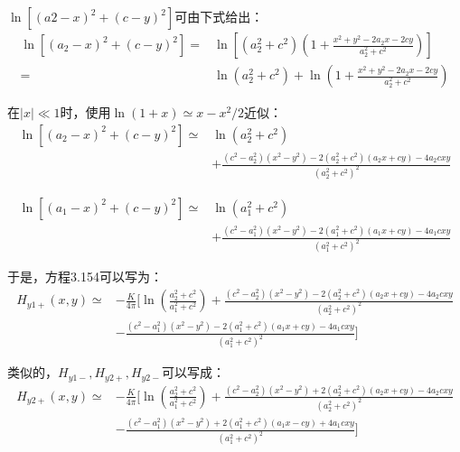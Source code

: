 $\ln[(a2−x)^2+(c−y)^2]$可由下式给出：
\begin{equation*}
\begin{split}
\ln[(a_{2}-x)^{2}+(c-y)^{2}]=&\ln[(a_{2}^{2}+c^{2})(1+\frac{x^{2}+y^{2}-2a_{2}x-2cy}{a_{2}^{2}+c^{2}})]\\
=&\ln(a_{2}^{2}+c^{2})+\ln(1+\frac{x^{2}+y^{2}-2a_{2}x-2cy}{a_{2}^{2}+c^{2}})
\end{split}
\end{equation*}

在$|x|\ll 1$时，使用$\ln(1+x)\simeq x-x^2 /2$近似：
\begin{equation*}
\begin{split}
\ln[(a_{2}-x)^{2}+(c-y)^{2}]\simeq&\ln(a_{2}^{2}+c^{2})\\
&+\frac{(c^{2}-a_{2}^{2})(x^{2}-y^{2})-2(a_{2}^{2}+c^{2})(a_{2}x+cy)-4a_{2}cxy}{(a_{2}^{2}+c^{2})^{2}}
\end{split}
\end{equation*}

\begin{equation*}
\begin{split}
\ln[(a_{1}-x)^{2}+(c-y)^{2}]\simeq&\ln(a_{1}^{2}+c^{2})\\
&+\frac{(c^{2}-a_{1}^{2})(x^{2}-y^{2})-2(a_{1}^{2}+c^{2})(a_{1}x+cy)-4a_{1}cxy}{(a_{1}^{2}+c^{2})^{2}}
\end{split}
\end{equation*}

于是，方程3.154可以写为：
\begin{equation}
\begin{split}
H_{y1+}(x,y)\simeq&-\frac{K}{4\pi}[\ln(\frac{a_{2}^{2}+c^{2}}{a_{1}^{2}+c^{2}})+\frac{(c^{2}-a_{2}^{2})(x^{2}-y^{2})-2(a_{2}^{2}+c^{2})(a_{2}x+cy)-4a_{2}cxy}{(a_{2}^{2}+c^{2})^{2}}\\
&-\frac{(c^{2}-a_{1}^{2})(x^{2}-y^{2})-2(a_{1}^{2}+c^{2})(a_{1}x+cy)-4a_{1}cxy}{(a_{1}^{2}+c^{2})^{2}}]%
\end{split}
\end{equation}

类似的，$H_{y1−}, H_{y2+}, H_{y2−}$可以写成：
\begin{equation}
\begin{split}
H_{y2+}(x,y)\simeq&-\frac{K}{4\pi}[\ln(\frac{a_{2}^{2}+c^{2}}{a_{1}^{2}+c^{2}})+\frac{(c^{2}-a_{2}^{2})(x^{2}-y^{2})+2(a_{2}^{2}+c^{2})(a_{2}x+cy)-4a_{2}cxy}{(a_{2}^{2}+c^{2})^{2}}\\
&-\frac{(c^{2}-a_{1}^{2})(x^{2}-y^{2})+2(a_{1}^{2}+c^{2})(a_{1}x-cy)+4a_{1}cxy}{(a_{1}^{2}+c^{2})^{2}}]%
\end{split}
\end{equation}


